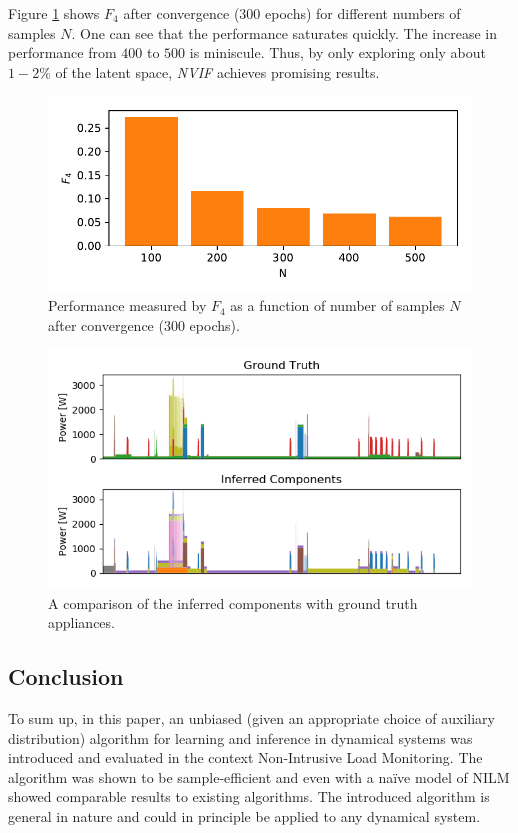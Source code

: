  Figure \ref{f4} shows $F_4$ after convergence (300 epochs) for different numbers of samples $N$. One can see that the performance saturates quickly. The increase in performance from $400$ to $500$ is miniscule. Thus, by only exploring only about $1-2\%$ of the latent space, \emph{NVIF} achieves promising results.
  \begin{figure}
      \centering
        \includegraphics[width=0.8\linewidth]{nvif/losses3.pdf}
      \caption[NVIF: Performance as a function of number of samples.]{Performance measured by $F_4$ as a function of number of samples $N$ after convergence (300 epochs).}
      \label{f4}
  \end{figure}
  
   \begin{figure}[h!]
      \centering
        \includegraphics[width=0.8\linewidth]{nvif/inferred.png}
      \caption[NVIF: A comparison of the inferred components with ground truth appliances.]{A comparison of the inferred components with ground truth appliances.}
      \label{nvif:inferred}
  \end{figure}
  

\subsection{Conclusion}
To sum up, in this paper, an unbiased (given an appropriate choice of auxiliary distribution) algorithm for learning and inference in dynamical systems was introduced and evaluated in the context Non-Intrusive Load Monitoring. The algorithm was shown to be sample-efficient and even with a na\"ive model of NILM showed comparable results to existing algorithms. The introduced algorithm is general in nature and could in principle be applied to any dynamical system.